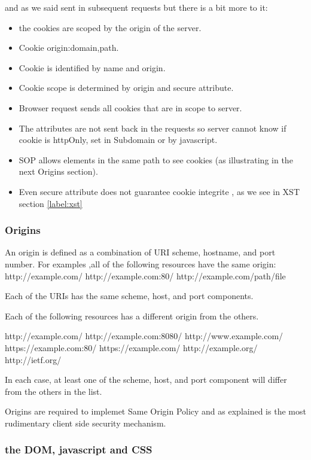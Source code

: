\documentclass[a4paper,12pt]{paper}
\begin{document}
and as we said sent in subsequent requests but there is a bit more to it:
\begin{itemize}
 \item the cookies are scoped by the origin of the server.\
 \item Cookie origin:domain,path.\
 \item Cookie is identified by name and origin.\
 \item Cookie  scope is	determined  by origin and secure attribute.\
 \item Browser request sends all cookies that are in scope to server.\
 \item The attributes are not sent back in the requests so server cannot know if cookie is httpOnly, set in Subdomain or by javascript.\
 \item SOP allows elements in the same path to see cookies (as illustrating in the next Origins section).\
 \item Even secure attribute does not guarantee cookie integrite , as we see in XST section \ref{label:xst} 
\end{itemize}

\todo{Add cookie caveats}

\subsubsection{Origins}

An origin is defined as a combination of URI scheme, hostname, and port number.
For examples ,all of the following resources have the same origin:
   http://example.com/
   http://example.com:80/
   http://example.com/path/file

   Each of the URIs has the same scheme, host, and port components.

   Each of the following resources has a different origin from the
   others.

   http://example.com/
   http://example.com:8080/
   http://www.example.com/
   https://example.com:80/
   https://example.com/
   http://example.org/
   http://ietf.org/

   In each case, at least one of the scheme, host, and port component
   will differ from the others in the list.

Origins are required to implemet Same Origin Policy and as explained is the most rudimentary client side security mechanism.
 
\subsubsection{the DOM, javascript and CSS}
\end{document}
